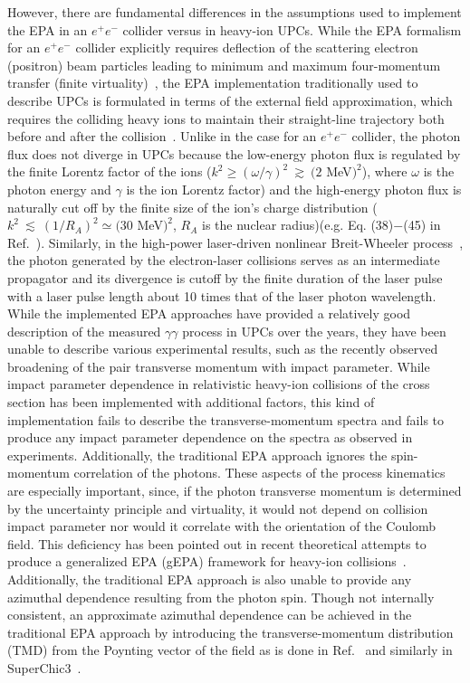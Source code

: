 \documentclass[12pt,epjc3]{svjour3}\sloppy
\begin{document}
However, there are fundamental differences in the assumptions used to implement the EPA in an $e^+e^-$ collider versus in heavy-ion UPCs. 
While the EPA formalism for an $e^+e^-$ collider explicitly requires deflection of the scattering electron (positron) beam particles leading to minimum and maximum four-momentum transfer (finite virtuality)~\cite{budnev_two-photon_1975}, the EPA implementation traditionally used to describe UPCs is formulated in terms of the external field approximation, which requires the colliding heavy ions to maintain their straight-line trajectory both before and after the collision~\cite{PhysRevC.47.2308}.
Unlike in the case for an $e^+e^-$ collider, the photon flux does not diverge in UPCs because the low-energy photon flux is regulated by the finite Lorentz factor of the ions ($k^2 \ge (\omega/\gamma)^2~ \gtrsim ~(2$ MeV$)^2$), where $\omega$ is the photon energy and $\gamma$ is the ion Lorentz factor) and the high-energy photon flux is naturally cut off by the finite size of the ion's charge distribution ($k^2~\lesssim~(1/R_A)^2 \simeq (30$ MeV$)^2$, $R_A$ is the nuclear radius)(e.g. Eq. (38)$-$(45) in Ref.~\cite{PhysRevC.47.2308}). 
Similarly, in the high-power laser-driven nonlinear Breit-Wheeler process~\cite{SLACPhysRevLett.79.1626}, the photon generated by the electron-laser collisions serves as an intermediate propagator and its divergence is cutoff by the finite duration of the laser pulse~\cite{SLACTridentQEDPRL2010} with a laser pulse length about 10 times that of the laser photon wavelength.
While the implemented EPA approaches have provided a relatively good description of the measured $\gamma\gamma$ process in UPCs over the years, they have been unable to describe various experimental results, such as the recently observed broadening of the pair transverse momentum with impact parameter. 
While impact parameter dependence in relativistic heavy-ion collisions of the cross section has been implemented with additional factors, this kind of implementation fails to describe the transverse-momentum spectra and fails to produce any impact parameter dependence on the spectra as observed in experiments. 
Additionally, the traditional EPA approach ignores the spin-momentum correlation of the photons. 
These aspects of the process kinematics are especially important, since, if the photon transverse momentum is determined by the uncertainty principle and virtuality, it would not depend on collision impact parameter nor would it correlate with the orientation of the Coulomb field. 
This deficiency has been pointed out in recent theoretical attempts to produce a generalized EPA (gEPA) framework for heavy-ion collisions~\cite{hencken_electromagnetic_1994,zhaInitialTransversemomentumBroadening2020b}. Additionally, the traditional EPA approach is also unable to provide any azimuthal dependence resulting from the photon spin.
Though not internally consistent, an approximate azimuthal dependence can be achieved in the traditional EPA approach by introducing the transverse-momentum distribution (TMD) from the Poynting vector of the field as is done in Ref.~\cite{liProbingLinearPolarization2019} and similarly in SuperChic3~\cite{SuperChic3}.
\end{document}
